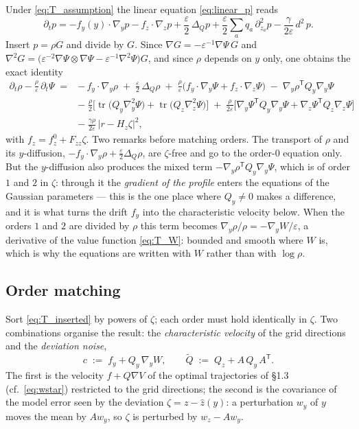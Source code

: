\documentclass[11pt,a4paper]{article}
\newcommand{\tr}{\operatorname{tr}}
\newcommand{\T}{^{\mathsf T}}
\newcommand{\zh}{\hat{z}}
\newcommand{\eps}{\varepsilon}
\newcommand{\abs}[1]{\left\lvert #1 \right\rvert}
\newcommand{\grad}{\nabla}
\newcommand{\gy}{\nabla_{\!y}}
\newcommand{\gz}{\nabla_{\!z}}
\newcommand{\Hy}{\nabla_{\!y}^2}
\theoremstyle{plain}
\theoremstyle{definition}
\theoremstyle{remark}
\begin{document}
Under \eqref{eq:T_assumption} the linear equation \eqref{eq:linear_p} reads
\[
  \partial_tp = -f_y(y)\cdot\gy p - f_z\cdot\gz p + \frac\eps2\,\Delta_Qp + \frac\eps2\sum_aq_a\,\partial_{z_a}^2p - \frac{\gamma}{2\eps}\,d^2\,p .
\]
Insert $p=\rho G$ and divide by $G$. Since $\grad G = -\eps^{-1}\grad\Psi\,G$ and $\grad^2G = \big(\eps^{-2}\grad\Psi\otimes\grad\Psi - \eps^{-1}\grad^2\Psi\big)G$, and since $\rho$ depends on $y$ only, one obtains the exact identity
\begin{equation}
\begin{aligned}
  \partial_t\rho - \frac\rho\eps\,\partial_t\Psi
  \;={}& -\,f_y\cdot\gy\rho \;+\; \frac\eps2\,\Delta_Q\rho
  \;+\; \frac\rho\eps\big(f_y\cdot\gy\Psi + f_z\cdot\gz\Psi\big)
  \;-\; \gy\rho\T Q_y\gy\Psi \\
  &-\; \frac\rho2\Big[\tr\big(Q_y\Hy\Psi\big) + \tr\big(Q_z\gz^2\Psi\big)\Big]
  \;+\; \frac{\rho}{2\eps}\Big[\gy\Psi\T Q_y\gy\Psi + \gz\Psi\T Q_z\gz\Psi\Big] \\
  &-\; \frac{\gamma\rho}{2\eps}\,\abs{r-H_z\zeta}^2 ,
\end{aligned}
\label{eq:T_inserted}
\end{equation}
with $f_z = f_z^0 + F_{zz}\zeta$. Two remarks before matching orders. The transport of $\rho$ and its $y$-diffusion, $-f_y\cdot\gy\rho + \tfrac\eps2\Delta_Q\rho$, are $\zeta$-free and go to the order-0 equation only. But the $y$-diffusion also produces the mixed term $-\gy\rho\T Q_y\gy\Psi$, which is of order $1$ and $2$ in $\zeta$: through it the \emph{gradient of the profile} enters the equations of the Gaussian parameters --- this is the one place where $Q_y\ne0$ makes a difference, and it is what turns the drift $f_y$ into the characteristic velocity below. When the orders $1$ and $2$ are divided by $\rho$ this term becomes $\gy\rho/\rho = -\gy W/\eps$, a derivative of the value function \eqref{eq:T_W}: bounded and smooth where $W$ is, which is why the equations are written with $W$ rather than with $\log\rho$.

\subsection{Order matching}

Sort \eqref{eq:T_inserted} by powers of $\zeta$; each order must hold identically in $\zeta$. Two combinations organise the result: the \emph{characteristic velocity} of the grid directions and the \emph{deviation noise},
\begin{equation}
  c \;:=\; f_y + Q_y\,\gy W, \qquad
  \tilde Q \;:=\; Q_z + A\,Q_y\,A\T .
  \label{eq:T_effective}
\end{equation}
The first is the velocity $f+Q\grad V$ of the optimal trajectories of \S1.3 (cf.\ \eqref{eq:wstar}) restricted to the grid directions; the second is the covariance of the model error seen by the deviation $\zeta = z-\zh(y)$: a perturbation $w_y$ of $y$ moves the mean by $Aw_y$, so $\zeta$ is perturbed by $w_z - Aw_y$.
\end{document}
